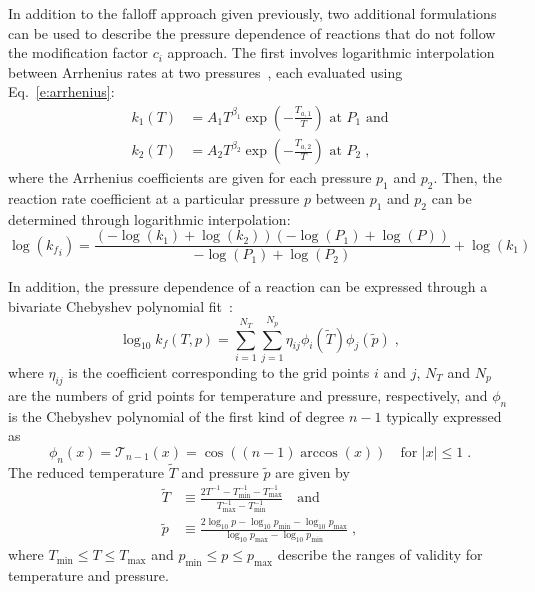 \documentclass[12pt]{article}
\begin{document}
In addition to the falloff approach given previously, two additional formulations can be used to describe the pressure dependence of reactions that do not follow the modification factor $c_i$ approach.
The first involves logarithmic interpolation between Arrhenius rates at two pressures~\cite{chemkin:2012,Goodwin:2015aa}, each evaluated using Eq.~\cref{e:arrhenius}:
\begin{align}
k_1 (T) &= A_1 T^{\beta_1} \exp \left( -\frac{T_{a, 1}}{T} \right) \text{ at } P_1 \text{ and} \label{e:plog_k1} \\
k_2 (T) &= A_2 T^{\beta_2} \exp \left( -\frac{T_{a, 2}}{T} \right) \text{ at } P_2 \;, \label{e:plog_k2}
\end{align}
where the Arrhenius coefficients are given for each pressure $p_1$ and $p_2$.
Then, the reaction rate coefficient at a particular pressure $p$ between $p_1$ and $p_2$ can be determined through logarithmic interpolation:
\begin{equation}
\log{\left ({k_f}_{i} \right )} = \frac{\left(- \log{\left (k_{1} \right )} + \log{\left (k_{2} \right )}\right) \left(- \log{\left (P_{1} \right )} + \log{\left (P \right )}\right)}{- \log{\left (P_{1} \right )} + \log{\left (P_{2} \right )}} + \log{\left (k_{1} \right )}
\end{equation}

In addition, the pressure dependence of a reaction can be expressed through a bivariate Chebyshev polynomial fit~\cite{Venkatesh:1997hv,Venkatesh:1997ik,Venkatesh:2000gj,chemkin:2012,Goodwin:2015aa}:
\begin{equation}
\log_{10} k_f (T, p) = \sum_{i = 1}^{N_T} \sum_{j = 1}^{N_p} \eta_{ij} \phi_i (\tilde{T}) \phi_j \left(\tilde{p}\right) \label{e:cheb} \;,
\end{equation}
where $\eta_{ij}$ is the coefficient corresponding to the grid points $i$ and $j$, $N_T$ and $N_p$ are the numbers of grid points for temperature and pressure, respectively, and $\phi_n$ is the Chebyshev polynomial of the first kind of degree $n - 1$ typically expressed as
\begin{equation}
\phi_n (x) = \mathcal{T}_{n-1} (x) = \cos \left( (n - 1) \arccos (x) \right) \quad \text{for } |x| \leq 1 \;.
\end{equation}
The reduced temperature $\tilde{T}$ and pressure $\tilde{p}$ are given by
\begin{align}
\tilde{T} &\equiv \frac{2 T^{-1} - T^{-1}_{\min} - T^{-1}_{\max}}{T^{-1}_{\max} - T^{-1}_{\min}} \quad\text{and} \\
\tilde{p} &\equiv \frac{2\log_{10} p - \log_{10} p_{\min} - \log_{10} p_{\max}}{\log_{10} p_{\max} - \log_{10} p_{\min}} \;,
\end{align}
where $T_{\min} \leq T \leq T_{\max}$ and $p_{\min} \leq p \leq p_{\max}$ describe the ranges of validity for temperature and pressure.
\end{document}
